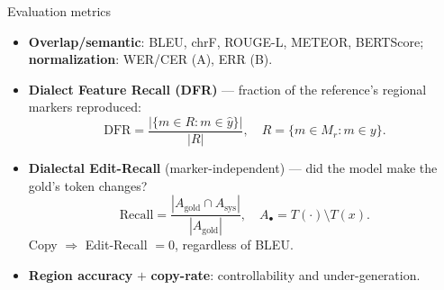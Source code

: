 \documentclass[aspectratio=169,11pt]{beamer}
\begin{document}
\begin{frame}{Evaluation metrics}
  \begin{itemize}\small
    \item \textbf{Overlap/semantic}: BLEU, chrF, ROUGE-L, METEOR, BERTScore;
          \textbf{normalization}: WER/CER (A), ERR (B).
    \item \textbf{Dialect Feature Recall (DFR)} --- fraction of the reference's regional markers reproduced:
      \[
        \mathrm{DFR}=\frac{\bigl|\{m\in R: m\in\hat y\}\bigr|}{|R|},\quad R=\{m\in M_r: m\in y\}.
      \]
    \item \textbf{Dialectal Edit-Recall} (marker-independent) --- did the model make the gold's token changes?
      \[
        \mathrm{Recall}=\frac{|A_{\text{gold}}\cap A_{\text{sys}}|}{|A_{\text{gold}}|},\quad
        A_\bullet = T(\cdot)\setminus T(x).
      \]
      Copy $\Rightarrow$ Edit-Recall $=0$, regardless of BLEU.
    \item \textbf{Region accuracy} $+$ \textbf{copy-rate}: controllability and under-generation.
  \end{itemize}
\end{frame}
\end{document}
